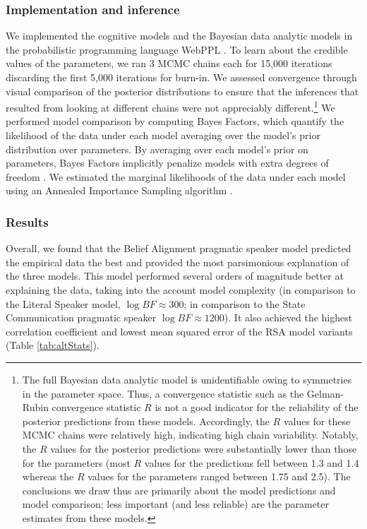 \documentclass[floatsintext, doc]{apa6}
\begin{document}
\subsubsection{Implementation and inference}

We implemented the cognitive models and the Bayesian data analytic models in the probabilistic programming language WebPPL \cite{dippl}. 
To learn about the credible values of the parameters, we ran 3 MCMC chains each for 15,000 iterations discarding the first 5,000 iterations for burn-in. 
We assessed convergence through visual comparison of the posterior distributions to ensure that the inferences that resulted from looking at different chains were not appreciably different.\footnote{
The full Bayesian data analytic model is unidentifiable owing to symmetries in the parameter space. Thus, a convergence statistic 
such as the Gelman-Rubin convergence statistic $R$ \cite{gelman1992inference} is not a good indicator for the reliability of the posterior predictions from these models. Accordingly, the $R$ values for these MCMC chains were relatively high, indicating high chain variability. Notably, the $R$ values for the posterior predictions were substantially lower than those for the parameters (most $R$ values for the predictions fell between 1.3 and 1.4 whereas the $R$ values for the parameters ranged between 1.75 and 2.5). The conclusions we draw thus are primarily about the model predictions and model comparison; less important (and less reliable) are the parameter estimates from these models.
}
We performed model comparison by computing Bayes Factors, which quantify the likelihood of the data under each model averaging over the model's prior distribution over parameters. By averaging over each model's prior on parameters, Bayes Factors implicitly penalize models with extra degrees of freedom \cite{lee2014bayesian}.
We estimated the marginal likelihoods of the data under each model using an Annealed Importance Sampling algorithm \cite{neal2001annealed}.

\subsubsection{Results}

Overall, we found that the Belief Alignment pragmatic speaker model predicted the empirical data the best and provided the most parsimonious explanation of the three models.
This model performed several orders of magnitude better at explaining the data, taking into the account model complexity (in comparison to the Literal Speaker model, $\log BF \approx 300$; in comparison to the State Communication pragmatic speaker $\log BF \approx 1200$).
It also achieved the highest correlation coefficient and lowest mean squared error of the RSA model variants (Table \ref{tab:altStats}).
\end{document}
